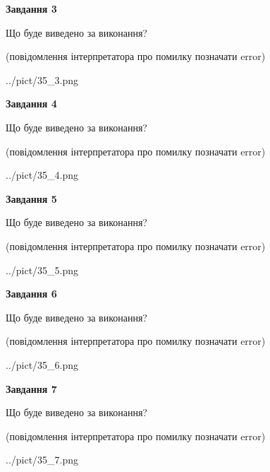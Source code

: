 \documentclass[12pt, ukrainian]{article}
\begin{document}
{\begin {large}
{\begin {center}\textbf{Завдання 3}\end {center}}\par
Що буде виведено за виконання?\par
 (повідомлення інтерпретатора про помилку позначати error)\par
\begin{center}
	{../pict/35_3.png}
\end{center}
\newpage

{\begin {center}\textbf{Завдання 4}\end {center}}\par
Що буде виведено за виконання?\par
 (повідомлення інтерпретатора про помилку позначати error)\par
\begin{center}
	{../pict/35_4.png}
\end{center}
\newpage

{\begin {center}\textbf{Завдання 5}\end {center}}\par
Що буде виведено за виконання?\par
 (повідомлення інтерпретатора про помилку позначати error)\par
\begin{center}
	{../pict/35_5.png}
\end{center}
\newpage

{\begin {center}\textbf{Завдання 6}\end {center}}\par
Що буде виведено за виконання?\par
 (повідомлення інтерпретатора про помилку позначати error)\par
\begin{center}
	{../pict/35_6.png}
\end{center}
\newpage

{\begin {center}\textbf{Завдання 7}\end {center}}\par
Що буде виведено за виконання?\par
 (повідомлення інтерпретатора про помилку позначати error)\par
\begin{center}
	{../pict/35_7.png}
\end{center}
\newpage


\end{large}}
\end{document}
